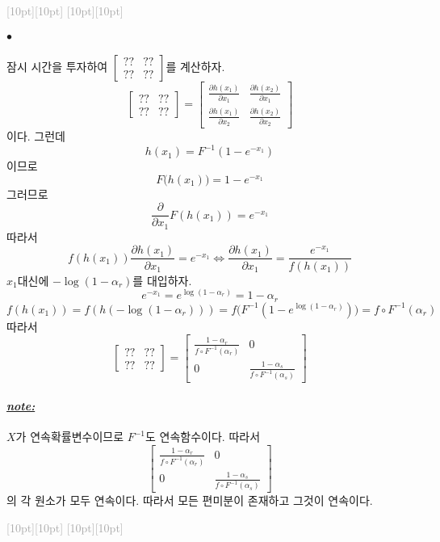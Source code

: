 \documentclass[12pt,oneside,english]{book}
\newcommand{\rdash}{\noindent \textcolor{darkgray}{ \raisebox{-1.9pt}[10pt][10pt]{\leafright} \hrulefill \raisebox{-1.9pt}[10pt][10pt]{\leafright \decofourleft \decothreeleft  \aldineright \decotwo \floweroneleft \decoone}}}
\def\ck{\paragraph{\Large$\bullet$}\Large}
\def\note{\paragraph{\Large\textit{\underline{note:}}}\Large}
\begin{document}
\rdash 

\ck 잠시 시간을 투자하여 $\begin{bmatrix}?? & ?? \\?? & ??\end{bmatrix}$를 계산하자. 
\[
\begin{bmatrix}?? & ?? \\?? & ??\end{bmatrix}
=
\begin{bmatrix}\frac{\partial h(x_1)}{\partial x_1} & \frac{\partial h(x_2)}{\partial x_1} \\ \frac{\partial h(x_1)}{\partial x_2} & \frac{\partial h(x_2)}{\partial x_2} \end{bmatrix}
\] 
이다. 그런데 
\[
h(x_1)=F^{-1}(1-e^{-x_1})
\]
이므로 
\[
F\big(h(x_1)\big)=1-e^{-x_1}
\]
그러므로 
\[
\frac{\partial}{\partial x_1} F(h(x_1))=e^{-x_1}
\]
따라서 
\[
f(h(x_1))\frac{\partial h(x_1)}{\partial x_1}=e^{-x_1} \Longleftrightarrow \frac{\partial h(x_1)}{\partial x_1}=\frac{e^{-x_1}}{f(h(x_1))}
\]
$x_1$대신에 $-\log(1-\alpha_r)$를 대입하자. 
\[
e^{-x_1}=e^{\log(1-\alpha_r)}= 1-\alpha_r
\]
\[
f(h(x_1))=f(h(-\log(1-\alpha_r)))=f\big(F^{-1}(1-e^{\log(1-\alpha_r)})\big)=f \circ F^{-1}(\alpha_r)
\]
따라서 
\[
\begin{bmatrix}?? & ?? \\ ?? & ??\end{bmatrix}=
\begin{bmatrix}\frac{1-\alpha_r}{f\circ F^{-1}(\alpha_r)} & 0 \\ 0 & \frac{1-\alpha_s}{f\circ F^{-1}(\alpha_s)}\end{bmatrix}
\]
\note $X$가 연속확률변수이므로 $F^{-1}$도 연속함수이다. 따라서 
\[
\begin{bmatrix}\frac{1-\alpha_r}{f\circ F^{-1}(\alpha_r)} & 0 \\ 0 & \frac{1-\alpha_s}{f\circ F^{-1}(\alpha_s)}\end{bmatrix}
\]
의 각 원소가 모두 연속이다. 따라서 모든 편미분이 존재하고 그것이 연속이다. 

\rdash 
\end{document}
